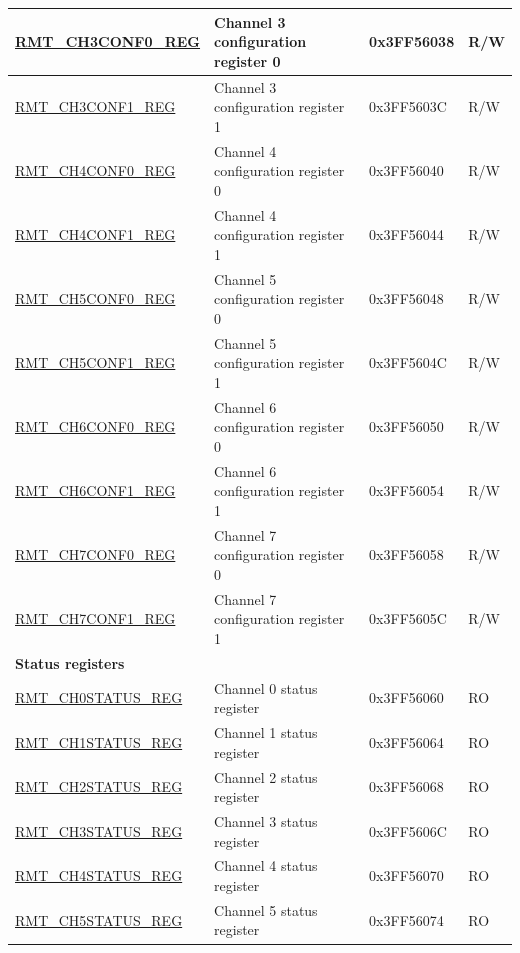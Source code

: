 \begin{longtable}{ |p{5cm}|p{6.6cm}|p{2.2cm}|p{1.2cm}| }
\hyperref[regdesc:RMTCHnCONF0REG]{RMT\_CH3CONF0\_REG} & Channel 3 configuration register 0 & 0x3FF56038 & R/W \\ \hline
\hyperref[regdesc:RMTCHnCONF1REG]{RMT\_CH3CONF1\_REG} & Channel 3 configuration register 1 & 0x3FF5603C & R/W \\ \hline
\hyperref[regdesc:RMTCHnCONF0REG]{RMT\_CH4CONF0\_REG} & Channel 4 configuration register 0 & 0x3FF56040 & R/W \\ \hline
\hyperref[regdesc:RMTCHnCONF1REG]{RMT\_CH4CONF1\_REG} & Channel 4 configuration register 1 & 0x3FF56044 & R/W \\ \hline
\hyperref[regdesc:RMTCHnCONF0REG]{RMT\_CH5CONF0\_REG} & Channel 5 configuration register 0 & 0x3FF56048 & R/W \\ \hline
\hyperref[regdesc:RMTCHnCONF1REG]{RMT\_CH5CONF1\_REG} & Channel 5 configuration register 1 & 0x3FF5604C & R/W \\ \hline
\hyperref[regdesc:RMTCHnCONF0REG]{RMT\_CH6CONF0\_REG} & Channel 6 configuration register 0 & 0x3FF56050 & R/W \\ \hline
\hyperref[regdesc:RMTCHnCONF1REG]{RMT\_CH6CONF1\_REG} & Channel 6 configuration register 1 & 0x3FF56054 & R/W \\ \hline
\hyperref[regdesc:RMTCHnCONF0REG]{RMT\_CH7CONF0\_REG} & Channel 7 configuration register 0 & 0x3FF56058 & R/W \\ \hline
\hyperref[regdesc:RMTCHnCONF1REG]{RMT\_CH7CONF1\_REG} & Channel 7 configuration register 1 & 0x3FF5605C & R/W \\ \hline
\multicolumn{4}{|l|}{\textbf{Status registers}} \\ \hline
\hyperref[regdesc:RMTCHnSTATUSREG]{RMT\_CH0STATUS\_REG} & Channel 0 status register & 0x3FF56060 & RO \\ \hline
\hyperref[regdesc:RMTCHnSTATUSREG]{RMT\_CH1STATUS\_REG} & Channel 1 status register & 0x3FF56064 & RO \\ \hline
\hyperref[regdesc:RMTCHnSTATUSREG]{RMT\_CH2STATUS\_REG} & Channel 2 status register & 0x3FF56068 & RO \\ \hline
\hyperref[regdesc:RMTCHnSTATUSREG]{RMT\_CH3STATUS\_REG} & Channel 3 status register & 0x3FF5606C & RO \\ \hline
\hyperref[regdesc:RMTCHnSTATUSREG]{RMT\_CH4STATUS\_REG} & Channel 4 status register & 0x3FF56070 & RO \\ \hline
\hyperref[regdesc:RMTCHnSTATUSREG]{RMT\_CH5STATUS\_REG} & Channel 5 status register & 0x3FF56074 & RO \\ \hline

\end{longtable}

